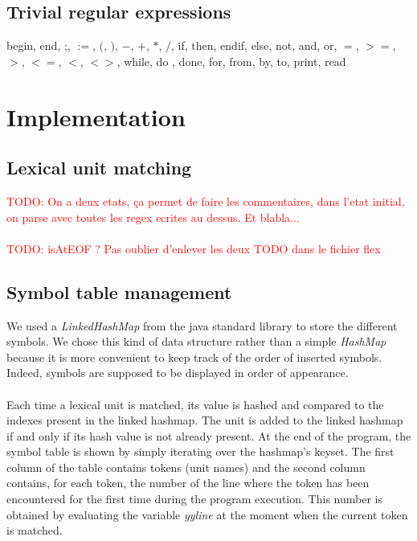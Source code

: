 \documentclass[12pt]{report}
\newcommand\todo[1]{\textcolor{red}{TODO: #1}}
\begin{document}
\section{Trivial regular expressions}

begin, end, ;, $:=$, $($, $)$, $-$, $+$, $*$, $/$, if, then, endif, else, not, and, or, $=$, $>=$, $>$, $<=$, $<$, $<>$, while, do , done, for, from, by, to, print, read

\chapter{Implementation}

\section{Lexical unit matching}

\todo{On a deux etats, ça permet de faire les commentaires, dans l'etat initial, on parse avec toutes les regex ecrites au dessus. Et blabla...}\\ \\

\noindent \todo{isAtEOF ? Pas oublier d'enlever les deux TODO dans le fichier flex}

\section{Symbol table management}

We used a \textit{LinkedHashMap} from the java standard library to store the different symbols. We chose this kind of data structure rather than
a simple \textit{HashMap} because it is more convenient to keep track of the order of inserted symbols. Indeed, symbols are supposed to be
displayed in order of appearance. \\ \\
Each time a lexical unit is matched, its value is hashed and compared to the indexes present in the linked hashmap. The unit is added to the linked hashmap 
if and only if its hash value is not already present. At the end of the program, the symbol table is shown by simply iterating over the hashmap's keyset. 
The first column of the table contains tokens (unit names) and the second column contains, for each token, the number of the line where the token has
been encountered for the first time during the program execution. This number is obtained by evaluating the variable \textit{yyline} at the moment when
the current token is matched.
\end{document}
